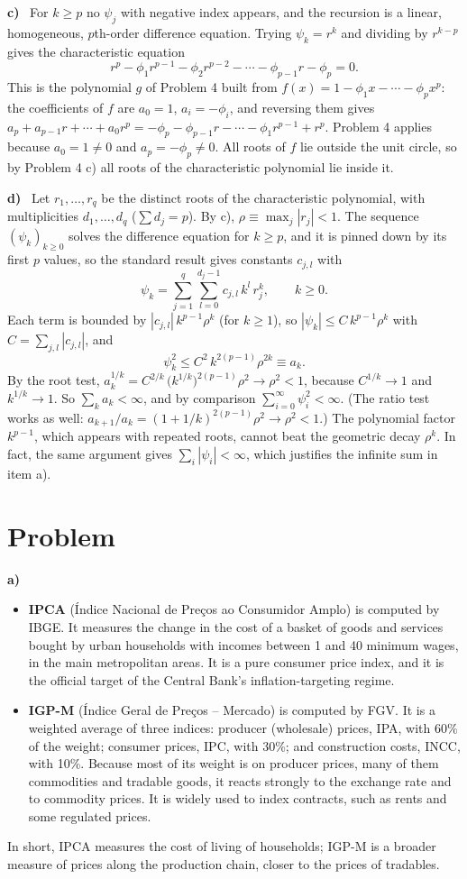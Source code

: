 \documentclass[11pt]{article}
\newcounter{problem}
\renewcommand{\theproblem}{\arabic{problem}}
\newcommand{\problem}{
	\stepcounter{problem}
	\section*{Problem \theproblem}
}
\newcommand{\itm}[1]{\par\textbf{#1)}\ }
\begin{document}
\itm{c}
For $k\ge p$ no $\psi_j$ with negative index appears, and the recursion is a linear, homogeneous, $p$th-order difference equation. Trying $\psi_k=r^k$ and dividing by $r^{k-p}$ gives the characteristic equation
\[
r^p-\phi_1r^{p-1}-\phi_2r^{p-2}-\cdots-\phi_{p-1}r-\phi_p = 0 .
\]
This is the polynomial $g$ of Problem 4 built from $f(x) = 1-\phi_1x-\cdots-\phi_px^p$: the coefficients of $f$ are $a_0=1$, $a_i=-\phi_i$, and reversing them gives $a_p+a_{p-1}r+\cdots+a_0r^p = -\phi_p-\phi_{p-1}r-\cdots-\phi_1r^{p-1}+r^p$. Problem 4 applies because $a_0=1\neq0$ and $a_p=-\phi_p\neq0$. All roots of $f$ lie outside the unit circle, so by Problem 4 c) all roots of the characteristic polynomial lie inside it.

\itm{d}
Let $r_1,\dots,r_q$ be the distinct roots of the characteristic polynomial, with multiplicities $d_1,\dots,d_q$ ($\sum d_j=p$). By c), $\rho\equiv\max_j|r_j|<1$. The sequence $(\psi_k)_{k\ge0}$ solves the difference equation for $k\ge p$, and it is pinned down by its first $p$ values, so the standard result gives constants $c_{j,l}$ with
\[
\psi_k = \sum_{j=1}^q\sum_{l=0}^{d_j-1}c_{j,l}\,k^l\,r_j^k,\qquad k\ge0 .
\]
Each term is bounded by $|c_{j,l}|\,k^{p-1}\rho^k$ (for $k\ge1$), so $|\psi_k|\le C\,k^{p-1}\rho^k$ with $C=\sum_{j,l}|c_{j,l}|$, and
\[
\psi_k^2\le C^2\,k^{2(p-1)}\rho^{2k} \equiv a_k .
\]
By the root test, $a_k^{1/k} = C^{2/k}\,\big(k^{1/k}\big)^{2(p-1)}\rho^2\to\rho^2<1$, because $C^{1/k}\to1$ and $k^{1/k}\to1$. So $\sum_ka_k<\infty$, and by comparison $\sum_{i=0}^\infty\psi_i^2<\infty$. (The ratio test works as well: $a_{k+1}/a_k = (1+1/k)^{2(p-1)}\rho^2\to\rho^2<1$.) The polynomial factor $k^{p-1}$, which appears with repeated roots, cannot beat the geometric decay $\rho^k$. In fact, the same argument gives $\sum_i|\psi_i|<\infty$, which justifies the infinite sum in item a).

\problem

\itm{a}
\begin{itemize}
	\item \textbf{IPCA} (\'Indice Nacional de Pre\c{c}os ao Consumidor Amplo) is computed by IBGE. It measures the change in the cost of a basket of goods and services bought by urban households with incomes between 1 and 40 minimum wages, in the main metropolitan areas. It is a pure consumer price index, and it is the official target of the Central Bank's inflation-targeting regime.
	\item \textbf{IGP-M} (\'Indice Geral de Pre\c{c}os -- Mercado) is computed by FGV. It is a weighted average of three indices: producer (wholesale) prices, IPA, with 60\% of the weight; consumer prices, IPC, with 30\%; and construction costs, INCC, with 10\%. Because most of its weight is on producer prices, many of them commodities and tradable goods, it reacts strongly to the exchange rate and to commodity prices. It is widely used to index contracts, such as rents and some regulated prices.
\end{itemize}
In short, IPCA measures the cost of living of households; IGP-M is a broader measure of prices along the production chain, closer to the prices of tradables.
\end{document}

